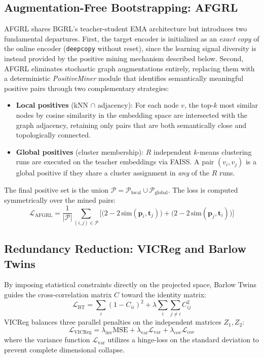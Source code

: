 \documentclass[conference]{IEEEtran}
\begin{document}
\subsection{Augmentation-Free Bootstrapping: AFGRL}
AFGRL \cite{afgrl} shares BGRL's teacher-student EMA architecture but introduces two fundamental departures. First, the target encoder is initialized as an \textit{exact copy} of the online encoder (\texttt{deepcopy} without reset), since the learning signal diversity is instead provided by the positive mining mechanism described below. Second, AFGRL eliminates stochastic graph augmentations entirely, replacing them with a deterministic \textit{PositiveMiner} module that identifies semantically meaningful positive pairs through two complementary strategies:
\begin{itemize}
    \item \textbf{Local positives} (kNN $\cap$ adjacency): For each node $v$, the top-$k$ most similar nodes by cosine similarity in the embedding space are intersected with the graph adjacency, retaining only pairs that are both semantically close and topologically connected.
    \item \textbf{Global positives} (cluster membership): $R$ independent $k$-means clustering runs are executed on the teacher embeddings via FAISS. A pair $(v_i, v_j)$ is a global positive if they share a cluster assignment in \textit{any} of the $R$ runs.
\end{itemize}
The final positive set is the union $\mathcal{P} = \mathcal{P}_{\text{local}} \cup \mathcal{P}_{\text{global}}$. The loss is computed symmetrically over the mined pairs:
\begin{equation}
\mathcal{L}_{\text{AFGRL}} = \frac{1}{|\mathcal{P}|} \sum_{(i,j) \in \mathcal{P}} \Big[ \big( 2 - 2\,\text{sim}(\bm{p}_i, \bm{t}_j) \big) + \big( 2 - 2\,\text{sim}(\bm{p}_j, \bm{t}_i) \big) \Big]
\end{equation}

\subsection{Redundancy Reduction: VICReg and Barlow Twins}
By imposing statistical constraints directly on the projected space, Barlow Twins \cite{barlow} guides the cross-correlation matrix $C$ toward the identity matrix:
\begin{equation}
\mathcal{L}_{\text{BT}} = \sum_{i}(1 - C_{ii})^2 + \lambda \sum_{i} \sum_{j \neq i} C_{ij}^2
\end{equation}
VICReg \cite{vicreg} balances three parallel penalties on the independent matrices $Z_1, Z_2$:
\begin{equation}
\mathcal{L}_{\text{VICReg}} = \lambda_{\text{inv}}\text{MSE} + \lambda_{\text{var}}\mathcal{L}_{\text{var}} + \lambda_{\text{cov}}\mathcal{L}_{\text{cov}}
\end{equation}
where the variance function $\mathcal{L}_{\text{var}}$ utilizes a hinge-loss on the standard deviation to prevent complete dimensional collapse.
\end{document}

